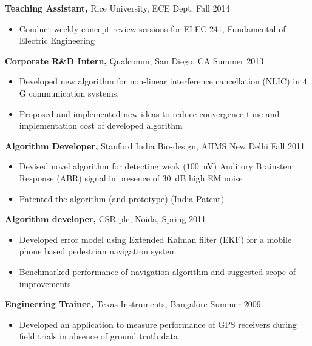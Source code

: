 \documentclass[margin]{res}
\begin{document}
\begin{resume}
\begin{itemize}
  \end{itemize}
  
  
 {\bf Teaching Assistant,} Rice University, ECE Dept.  \hfill Fall  2014
 \begin{itemize} \itemsep -2pt  %
 \item Conduct weekly concept review sessions for ELEC-$241$, Fundamental of Electric Engineering 

 \end{itemize}

 {\bf Corporate R\&D Intern,} Qualcomm, San Diego, CA \hfill Summer  2013
 \begin{itemize} \itemsep -2pt  %
 \item Developed new algorithm for non-linear interference cancellation (NLIC) in $4$G communication systems. 
 \item Proposed and implemented new ideas to reduce convergence time and implementation cost of developed algorithm 
 \end{itemize}

{\bf Algorithm Developer,} Stanford India Bio-design, AIIMS New Delhi \hfill Fall 2011
\begin{itemize} \itemsep -2pt %
\item Devised novel algorithm for detecting weak ($100$~nV) Auditory Brainstem Response (ABR) signal in presence of $30$~dB high EM noise
\item Patented the algorithm (and prototype) (India Patent)
 
\end{itemize}


{\bf Algorithm developer,} CSR plc, Noida,  \hfill
Spring 2011
\begin{itemize} \itemsep -2pt
 \item Developed error model using Extended Kalman filter (EKF) for a mobile phone based pedestrian navigation system
 \item Benchmarked performance of navigation algorithm and suggested scope of improvements

\end{itemize}
 
{\bf Engineering Trainee,} Texas Instruments, Bangalore  \hfill
Summer 2009
\begin{itemize} \itemsep -2pt
 \item Developed an application to measure performance of GPS receivers during field trials in absence of ground truth data 



\end{itemize}
\end{resume}
\end{document}
